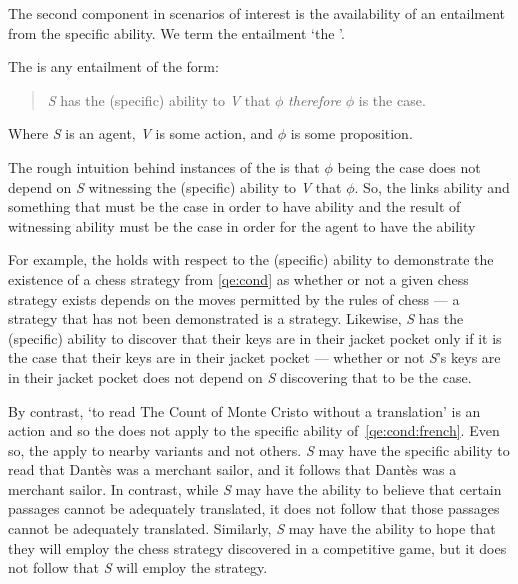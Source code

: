 \begin{note}[\aben{}]
  The second component in scenarios of interest is the availability of an entailment from the specific ability.
  We term the entailment `the \aben{}'.

  \begin{definition}
    The \aben{} is any entailment of the form:
    \begin{quote}
      \emph{S} has the (specific) ability to \emph{V} that \(\phi\) \emph{therefore} \(\phi\) is the case.
    \end{quote}
    Where \emph{S} is an agent, \emph{V} is some action, and \(\phi\) is some proposition.
  \end{definition}

  The rough intuition behind instances of the \aben{} is that \(\phi\) being the case does not depend on \emph{S} witnessing the (specific) ability to \emph{V} that \(\phi\).
  So, the \aben{} links ability and something that must be the case in order to have ability and the result of witnessing ability must be the case in order for the agent to have the ability

  For example, the \aben{} holds with respect to the (specific) ability to demonstrate the existence of a chess strategy from \ref{qe:cond} as whether or not a given chess strategy exists depends on the moves permitted by the rules of chess --- a strategy that has not been demonstrated is a strategy.
  Likewise, \emph{S} has the (specific) ability to discover that their keys are in their jacket pocket only if it is the case that their keys are in their jacket pocket --- whether or not \emph{S}'s keys are in their jacket pocket does not depend on \emph{S} discovering that to be the case.

  By contrast, `to read The Count of Monte Cristo without a translation' is an action and so the \aben{} does not apply to the specific ability of~\ref{qe:cond:french}.
  Even so, the \aben{} apply to nearby variants and not others.
  \emph{S} may have the specific ability to read that Dantès was a merchant sailor, and it follows that Dantès was a merchant sailor.
  In contrast, while \emph{S} may have the ability to believe that certain passages cannot be adequately translated, it does not follow that those passages cannot be adequately translated.
  Similarly, \emph{S} may have the ability to hope that they will employ the chess strategy discovered in a competitive game, but it does not follow that \emph{S} will employ the strategy.


\end{note}
